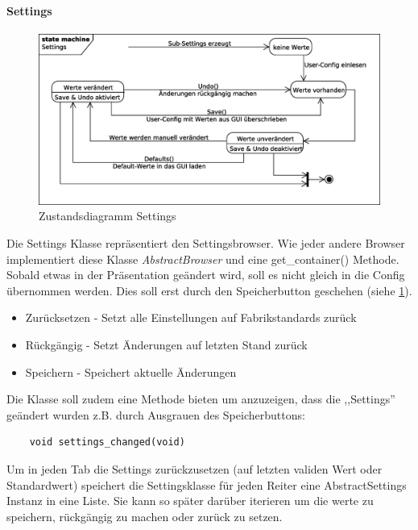 \newpage

\paragraph{Settings}
\begin{figure}[htb!]
	\centering
        \includegraphics[width=\textwidth]{st_Settings.eps}
	\caption{Zustandsdiagramm Settings}
	\label{st_settings}
\end{figure}
Die Settings Klasse repräsentiert den Settingsbrowser. Wie jeder andere Browser implementiert diese Klasse \emph{AbstractBrowser} und eine get\_container() Methode.
Sobald etwas in der Präsentation geändert wird, soll es nicht gleich in die Config übernommen werden.
Dies soll erst durch den Speicherbutton geschehen (siehe \ref{st_settings}).
\begin{itemize}
\item Zurücksetzen - Setzt alle Einstellungen auf Fabrikstandards zurück
\item Rückgängig - Setzt Änderungen auf letzten Stand zurück
\item Speichern - Speichert aktuelle Änderungen
\end{itemize}

Die Klasse soll zudem eine Methode bieten um anzuzeigen, dass die ,,Settings'' geändert wurden z.B. durch Ausgrauen des Speicherbuttons:
\begin{verbatim}
    void settings_changed(void)
\end{verbatim}
Um in jeden Tab die Settings zurückzusetzen (auf letzten validen Wert oder Standardwert) speichert die Settingsklasse für jeden Reiter eine AbstractSettings Instanz in eine Liste. Sie kann so später darüber iterieren um die werte zu speichern, rückgängig zu machen oder zurück zu setzen. 


